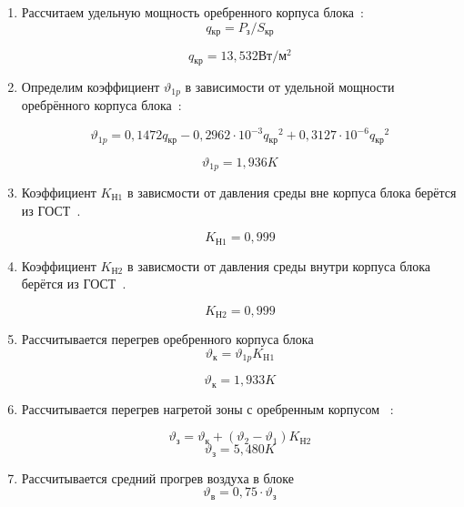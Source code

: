 \begin{enumerate}[label={\arabic*.}]
\item Рассчитаем удельную мощность оребренного
  корпуса блока~\cite{Rotkop1976}:
  \begin{equation}
      q\mathrm{_{кр}} = P\mathrm{_{з}} / S\mathrm{_{кр}}
    \end{equation}
    
    $$q\mathrm{_{кр}} = 13,532 \mathrm{Вт/м^2}$$

\item
    Определим коэффициент $\vartheta_{1p}$ в зависимости от удельной
    мощности оребрённого корпуса блока~\cite{Rotkop1976}:

\begin{equation}
\vartheta_{1p} = 0,1472q\mathrm{_{кр}} - 0,2962 \cdot 10^{-3}q\mathrm{_{кр}}^2 + 0,3127 \cdot 10^{-6}q\mathrm{_{кр}}^2      
\end{equation}

$$\vartheta_{1p}= 1,936K$$

\item Коэффициент $K\mathrm{_{Н1}}$ в зависмости от давления
  среды вне корпуса блока берётся из ГОСТ~\cite{GOST_15150-69}.

  $$K\mathrm{_{Н1}} = 0,999$$


\item Коэффициент $K\mathrm{_{Н2}}$ в зависмости от давления
  среды внутри корпуса блока берётся из ГОСТ~\cite{GOST_15150-69}.

  $$K\mathrm{_{Н2}} = 0,999$$

\item Рассчитывается перегрев оребренного корпуса блока
  \begin{equation}
    \vartheta\mathrm{_к} =\vartheta{_{1p}}K\mathrm{_{H1}}
  \end{equation}

  $$\vartheta\mathrm{_к} = 1,933K$$

\item Рассчитывается
  перегрев нагретой зоны
  с оребренным корпусом ~\cite{Rotkop1976}:

\begin{equation}
    \vartheta\mathrm{_з} = \vartheta{_к} +(\vartheta_2 - \vartheta_1)K\mathrm{_{Н2}}
  \end{equation}
  $$\vartheta\mathrm{_з} = 5,480K$$

\item Рассчитывается средний прогрев воздуха в блоке
  \begin{equation}
    \vartheta\mathrm{_в} = 0,75 \cdot \vartheta\mathrm{_з}
  \end{equation}
  

\end{enumerate}
